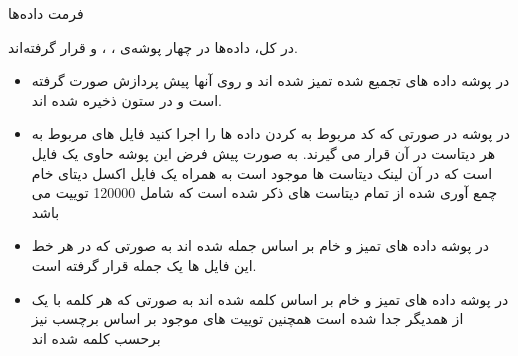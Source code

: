 \Section
{فرمت داده‌ها}
{
	در کل، داده‌ها در چهار پوشه‌ی 
	،
	،
	و
	قرار گرفته‌اند.
	
	\begin{center}
	\end{center}
	
	\begin{itemize}
		\item در پوشه 
		داده های تجمیع شده تمیز شده اند و روی آنها پیش پردازش صورت گرفته است و در ستون 
		ذخیره شده اند.
		
		\item در پوشه 
		در صورتی که کد مربوط به 
		کردن داده ها را اجرا کنید فایل های 
		مربوط به هر دیتاست در آن قرار می گیرند. به صورت پیش فرض این پوشه حاوی یک فایل 
		است که در آن لینک دیتاست ها موجود است به همراه یک فایل اکسل 
		دیتای خام چمع آوری شده از تمام دیتاست های ذکر شده است که شامل 120000 توییت می باشد
		
		\item در پوشه 
		داده های تمیز و خام بر اساس جمله 
		شده اند به صورتی که در هر خط این فایل ها یک جمله قرار گرفته است.
		
		\item در پوشه 
		داده های تمیز و خام بر اساس کلمه 
		شده اند به صورتی که هر کلمه با یک 
		از همدیگر جدا شده است
		همچنین توییت های موجود بر اساس برچسب نیز برحسب کلمه 
		شده اند
	\end{itemize}
	
}